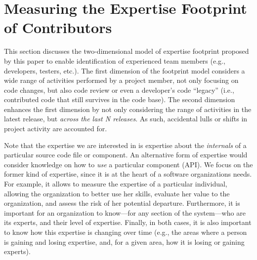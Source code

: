 







\section{Measuring the Expertise Footprint of Contributors}
\label{sec:expertise-formula}

This section discusses the two-dimensional model of expertise footprint proposed by this paper to enable identification of experienced team members (e.g., developers, testers, etc.). The first dimension of the footprint model considers a wide range of activities performed by a project member, not only focusing on code changes, but also code review or even a developer's code ``legacy'' (i.e., contributed code that still survives in the code base). The second dimension enhances the first dimension by not only considering the range of activities in the latest release, but \emph{across the last N releases}. As such, accidental lulls or shifts in project activity are accounted for.

Note that the expertise we are interested in is expertise about the {\em internals} of a particular source code file or component. An alternative form of expertise would consider knowledge on how to {\em use} a particular component (API). We focus on the former kind of expertise, since it is at the heart of a software organizations needs. For example, it allows to measure the expertise of a particular individual, allowing the organization to better use her skills, evaluate her value to the
organization, and assess the risk of her potential departure. Furthermore, it is important for an organization to know---for any
section of the system---who are its experts, and their level of expertise. Finally, in both cases, it is also
important to know how this expertise is changing over time (e.g., the areas where a person is gaining and losing
expertise, and, for a given area, how it is losing or gaining experts).


